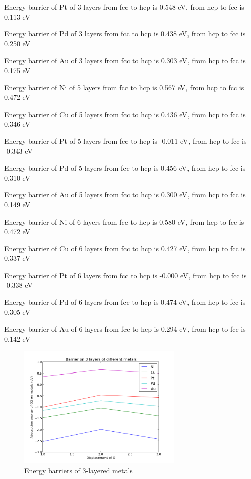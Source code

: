 \documentclass[11pt]{article}
\begin{document}
Energy barrier of Pt of 3 layers from fcc to hcp is 0.548 eV, from hcp to fcc is 0.113 eV

Energy barrier of Pd of 3 layers from fcc to hcp is 0.438 eV, from hcp to fcc is 0.250 eV

Energy barrier of Au of 3 layers from fcc to hcp is 0.303 eV, from hcp to fcc is 0.175 eV

Energy barrier of Ni of 5 layers from fcc to hcp is 0.567 eV, from hcp to fcc is 0.472 eV

Energy barrier of Cu of 5 layers from fcc to hcp is 0.436 eV, from hcp to fcc is 0.346 eV

Energy barrier of Pt of 5 layers from fcc to hcp is -0.011 eV, from hcp to fcc is -0.343 eV

Energy barrier of Pd of 5 layers from fcc to hcp is 0.456 eV, from hcp to fcc is 0.310 eV

Energy barrier of Au of 5 layers from fcc to hcp is 0.300 eV, from hcp to fcc is 0.149 eV

Energy barrier of Ni of 6 layers from fcc to hcp is 0.580 eV, from hcp to fcc is 0.472 eV

Energy barrier of Cu of 6 layers from fcc to hcp is 0.427 eV, from hcp to fcc is 0.337 eV

Energy barrier of Pt of 6 layers from fcc to hcp is -0.000 eV, from hcp to fcc is -0.338 eV

Energy barrier of Pd of 6 layers from fcc to hcp is 0.474 eV, from hcp to fcc is 0.305 eV

Energy barrier of Au of 6 layers from fcc to hcp is 0.294 eV, from hcp to fcc is 0.142 eV

\begin{figure}[H]
\centering
\includegraphics[width=0.7\textwidth]{./images/barrier-3.png}
\caption{Energy barriers of 3-layered metals}
\end{figure}
\end{document}
